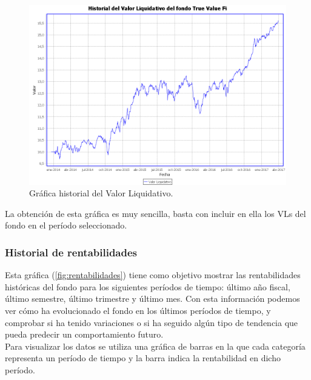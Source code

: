 \documentclass[12pt, a4paper]{book}
\begin{document}
	\begin{figure}[htbp]
	\centering
	\includegraphics[width=\textwidth]{figuras/historial.PNG}
	\caption{Gráfica historial del Valor Liquidativo.}
	\label{fig:historial}
	\end {figure}

La obtención de esta gráfica es muy sencilla, basta con incluir en ella los \gls{VL}s del fondo en el período seleccionado.

\newpage

\subsubsection{Historial de rentabilidades}

Esta gráfica (\ref{fig:rentabilidades}) tiene como objetivo mostrar las rentabilidades históricas del fondo para los siguientes períodos de tiempo: último año fiscal, último semestre, último trimestre y último mes. Con esta información podemos ver cómo ha evolucionado el fondo en los últimos períodos de tiempo, y comprobar si ha tenido variaciones o si ha seguido algún tipo de tendencia que pueda predecir un comportamiento futuro.\\

Para visualizar los datos se utiliza una gráfica de barras en la que cada categoría representa un período de tiempo y la barra indica la rentabilidad en dicho período.
\end{document}
